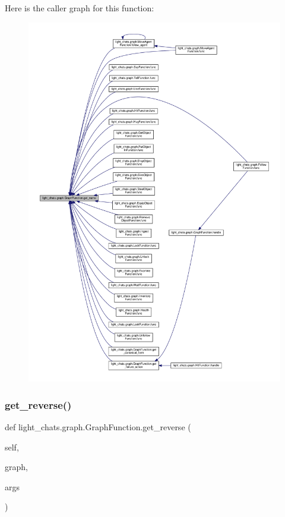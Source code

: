 Here is the caller graph for this function\+:
\nopagebreak
\begin{figure}[H]
\begin{center}
\leavevmode
\includegraphics[width=350pt]{classlight__chats_1_1graph_1_1GraphFunction_a6fb123ff0ec87dde23a5ce8a1614bbbe_icgraph}
\end{center}
\end{figure}
\mbox{\label{classlight__chats_1_1graph_1_1GraphFunction_aa7929e44e5afafd4d27418c7fe5a2fe0}} 
\subsubsection{\texorpdfstring{get\+\_\+reverse()}{get\_reverse()}}
{\footnotesize\ttfamily def light\+\_\+chats.\+graph.\+Graph\+Function.\+get\+\_\+reverse (\begin{DoxyParamCaption}\item[{}]{self,  }\item[{}]{graph,  }\item[{}]{args }\end{DoxyParamCaption})}

